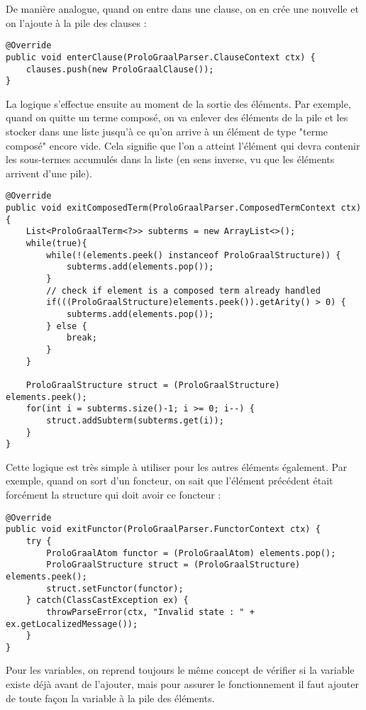 \documentclass[../report.tex]{subfiles}
\begin{document}
De manière analogue, quand on entre dans une clause, on en crée une nouvelle et on l'ajoute à la pile des clauses :
\begin{verbatim}
@Override
public void enterClause(ProloGraalParser.ClauseContext ctx) {
    clauses.push(new ProloGraalClause());
}
\end{verbatim}
La logique s'effectue ensuite au moment de la sortie des éléments. Par exemple, quand on quitte un terme composé, on va enlever des éléments de la pile et les stocker dans une liste jusqu'à ce qu'on arrive à un élément de type "terme composé" encore vide. Cela signifie que l'on a atteint l'élément qui devra contenir les sous-termes accumulés dans la liste (en sens inverse, vu que les éléments arrivent d'une pile).
\begin{verbatim}
@Override
public void exitComposedTerm(ProloGraalParser.ComposedTermContext ctx) {
    List<ProloGraalTerm<?>> subterms = new ArrayList<>();
    while(true){
        while(!(elements.peek() instanceof ProloGraalStructure)) {
            subterms.add(elements.pop());
        }
        // check if element is a composed term already handled
        if(((ProloGraalStructure)elements.peek()).getArity() > 0) {
            subterms.add(elements.pop());
        } else {
            break;
        }
    }

    ProloGraalStructure struct = (ProloGraalStructure) elements.peek();
    for(int i = subterms.size()-1; i >= 0; i--) {
        struct.addSubterm(subterms.get(i));
    }
}
\end{verbatim}
Cette logique est très simple à utiliser pour les autres éléments également. Par exemple, quand on sort d'un foncteur, on sait que l'élément précédent était forcément la structure qui doit avoir ce foncteur :
\begin{verbatim}
@Override
public void exitFunctor(ProloGraalParser.FunctorContext ctx) {
    try {
        ProloGraalAtom functor = (ProloGraalAtom) elements.pop();
        ProloGraalStructure struct = (ProloGraalStructure) elements.peek();
        struct.setFunctor(functor);
    } catch(ClassCastException ex) {
        throwParseError(ctx, "Invalid state : " + ex.getLocalizedMessage());
    }
}
\end{verbatim}
Pour les variables, on reprend toujours le même concept de vérifier si la variable existe déjà avant de l'ajouter, mais pour assurer le fonctionnement il faut ajouter de toute façon la variable à la pile des éléments. 
\end{document}
